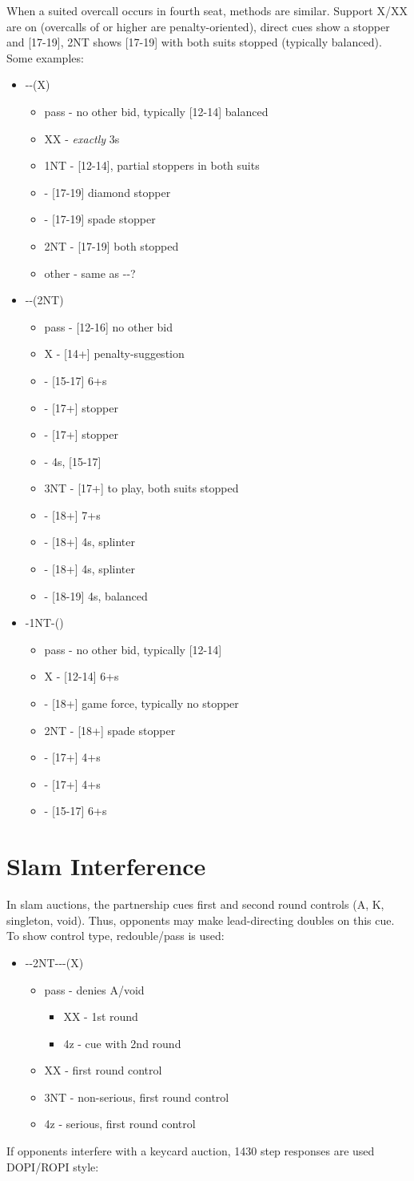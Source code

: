 \documentclass[12pt]{report}
\newcommand{\ul}[1]{\begin{itemize}#1\end{itemize}}
\newcommand{\li}{\item[~]}
\begin{document}
    When a suited overcall occurs in fourth seat, methods are similar.  Support X/XX are on (overcalls of  or higher are penalty-oriented), direct cues show a stopper and [17-19], 2NT shows [17-19] with both suits stopped (typically balanced).  Some examples:

    \ul {
        \li {}--(X)
        \ul {
            \li pass - no other bid, typically [12-14] balanced
            \li XX - \textit{exactly} 3\he{}s
            \li 1NT - [12-14], partial stoppers in both suits
            \li \di2 - [17-19] diamond stopper
            \li \sp2 - [17-19] spade stopper
            \li 2NT - [17-19] both stopped
            \li other - same as \cl1-\he1-?
        }
        \li \cl1-\sp1-(2NT)
        \ul {
            \li pass - [12-16] no other bid
            \li X - [14+] penalty-suggestion
            \li \cl3 - [15-17] 6+\cl{}s
            \li \di3 - [17+] stopper
            \li \he3 - [17+] stopper
            \li \sp3 - 4\sp{}s, [15-17]
            \li 3NT - [17+] to play, both suits stopped
            \li \cl4 - [18+] 7+\cl{}s
            \li \di4 - [18+] 4\sp{}s, splinter
            \li \di4 - [18+] 4\he{}s, splinter
            \li \sp4 - [18-19] 4\sp{}s, balanced
        }
        \li \he1-1NT-(\he2)
        \ul {
            \li pass - no other bid, typically [12-14]
            \li X - [12-14] 6+\he{}s
            \li \sp2 - [18+] game force, typically no stopper
            \li 2NT - [18+] spade stopper
            \li \cl3 - [17+] 4+\cl{}s
            \li \di3 - [17+] 4+\di{}s
            \li \he3 - [15-17] 6+\he{}s
        }
    }
\newpage
\section{Slam Interference} \label{3:7}

    In slam auctions, the partnership cues first and second round controls (A, K, singleton, void).  Thus, opponents may make lead-directing doubles on this cue.  To show control type, redouble/pass is used:

    \ul {
        \li--2NT---(X)
        \ul {
            \li pass - denies A/void
            \ul {
                \li XX - 1st round
                \li 4z - cue with 2nd round
            }
            \li XX - first round control
            \li 3NT - non-serious, first round control
            \li 4z - serious, first round control
        }
    }

    If opponents interfere with a keycard auction, 1430 step responses are used DOPI/ROPI style:
\end{document}
